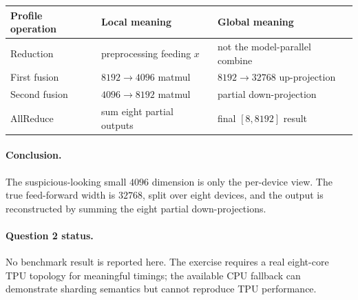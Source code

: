 \documentclass[11pt]{article}
\begin{document}
\begin{center}
\begin{tabular}{@{}lll@{}}
\toprule
Profile operation & Local meaning & Global meaning \\
\midrule
Reduction & preprocessing feeding \(x\) & not the model-parallel combine \\
First fusion & \(8192\to4096\) matmul & \(8192\to32768\) up-projection \\
Second fusion & \(4096\to8192\) matmul & partial down-projection \\
AllReduce & sum eight partial outputs & final \([8,8192]\) result \\
\bottomrule
\end{tabular}
\end{center}

\paragraph{Conclusion.}
The suspicious-looking small \(4096\) dimension is only the per-device
view.  The true feed-forward width is \(32768\), split over eight devices,
and the output is reconstructed by summing the eight partial
down-projections.

\paragraph{Question 2 status.}
No benchmark result is reported here.  The exercise requires a real
eight-core TPU topology for meaningful timings; the available CPU fallback
can demonstrate sharding semantics but cannot reproduce TPU performance.
\end{document}
